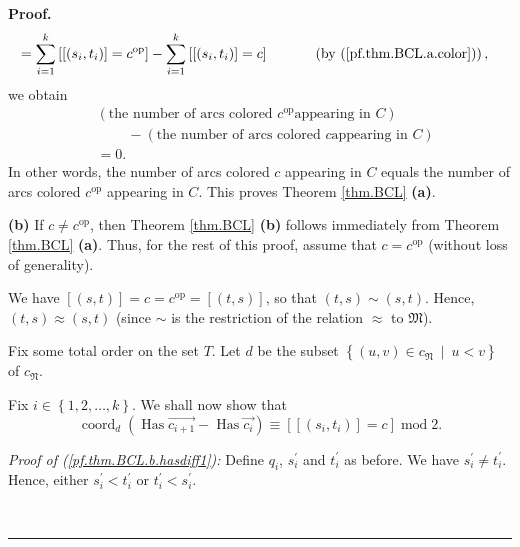 \documentclass[numbers=enddot,12pt,final,onecolumn,notitlepage,abstracton]{scrartcl}%
\theoremstyle{definition}
\newenvironment{proof}[1][Proof]{\noindent\textbf{#1.} }{\ \rule{0.5em}{0.5em}}
\let\sumnonlimits\sum
\renewcommand{\sum}{\sumnonlimits\limits}
\begin{document}
\begin{proof}
\begin{align*}
&  =\sum_{i=1}^{k}\left[  \left[  \left(  s_{i},t_{i}\right)  \right]
=c^{\operatorname*{op}}\right]  -\sum_{i=1}^{k}\left[  \left[  \left(
s_{i},t_{i}\right)  \right]  =c\right]  \ \ \ \ \ \ \ \ \ \ \left(  \text{by
(\ref{pf.thm.BCL.a.color})}\right)  ,
\end{align*}
we obtain%
\begin{align*}
&  \left(  \text{the number of arcs colored }c^{\operatorname*{op}}\text{
appearing in }C\right) \\
&  \ \ \ \ \ \ \ \ \ \ -\left(  \text{the number of arcs colored }c\text{
appearing in }C\right) \\
&  =0.
\end{align*}
In other words, the number of arcs colored $c$ appearing in $C$ equals the
number of arcs colored $c^{\operatorname*{op}}$ appearing in $C$. This proves
Theorem \ref{thm.BCL} \textbf{(a)}. \medskip

\textbf{(b)} If $c\neq c^{\operatorname*{op}}$, then Theorem \ref{thm.BCL}
\textbf{(b)} follows immediately from Theorem \ref{thm.BCL} \textbf{(a)}.
Thus, for the rest of this proof, assume that $c=c^{\operatorname*{op}}$
(without loss of generality).

We have $\left[  \left(  s,t\right)  \right]  =c=c^{\operatorname*{op}%
}=\left[  \left(  t,s\right)  \right]  $, so that $\left(  t,s\right)
\sim\left(  s,t\right)  $. Hence, $\left(  t,s\right)  \approx\left(
s,t\right)  $ (since $\sim$ is the restriction of the relation $\approx$ to
$\mathfrak{M}$).

Fix some total order on the set $T$. Let $d$ be the subset $\left\{  \left(
u,v\right)  \in c_{\mathfrak{N}}\ \mid\ u<v\right\}  $ of $c_{\mathfrak{N}}$.

Fix $i\in\left\{  1,2,\ldots,k\right\}  $. We shall now show that%
\begin{equation}
\operatorname*{coord}\nolimits_{d}\left(  \operatorname*{Has}%
\overrightarrow{c_{i+1}}-\operatorname*{Has}\overrightarrow{c_{i}}\right)
\equiv\left[  \left[  \left(  s_{i},t_{i}\right)  \right]  =c\right]
\operatorname{mod}2. \label{pf.thm.BCL.b.hasdiff1}%
\end{equation}


\textit{Proof of (\ref{pf.thm.BCL.b.hasdiff1}):} Define $q_{i}$,
$s_{i}^{\prime}$ and $t_{i}^{\prime}$ as before. We have $s_{i}^{\prime}\neq
t_{i}^{\prime}$. Hence, either $s_{i}^{\prime}<t_{i}^{\prime}$ or
$t_{i}^{\prime}<s_{i}^{\prime}$.


\end{proof}
\end{document}
